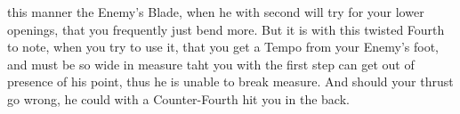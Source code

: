 this manner the Enemy's Blade, when he with second will try for your
lower openings, that you frequently just bend more.
But it is with this twisted Fourth to note, when you try to use it,
that you get a Tempo from your Enemy's foot, and must be so wide in
measure taht you with the first step can get out of presence of his
point, thus he is unable to break measure. And should your thrust go
wrong, he could with a Counter-Fourth hit you in the back.


